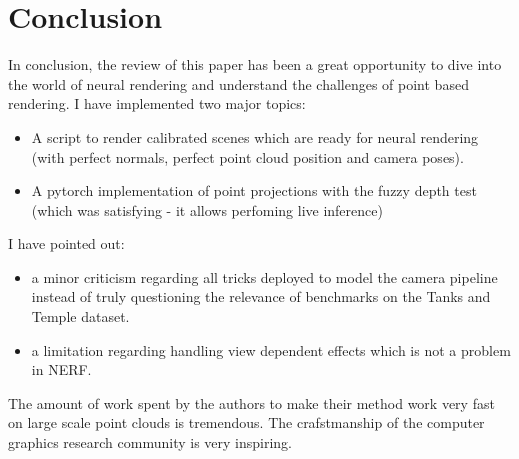 \section{Conclusion}
\label{sec:conclusion}

In conclusion, the review of this paper has been a great opportunity to dive into the world of neural rendering and understand the challenges of point based rendering.
I have implemented two major topics: 
\begin{itemize}
    \item A script to render calibrated scenes which are ready for neural rendering (with perfect normals, perfect point cloud position and camera poses). 
    \item A pytorch implementation of point projections with the fuzzy depth test (which was satisfying - it allows perfoming live inference)
\end{itemize}
I have pointed out: 
\begin{itemize}
    \item a minor criticism regarding all tricks deployed to model the camera pipeline instead of truly questioning the relevance of benchmarks on the Tanks and Temple dataset. 
    \item a limitation regarding handling view dependent effects which is not a problem in NERF.
\end{itemize}

The amount of work spent by the authors to make their method work very fast on large scale point clouds is tremendous. The crafstmanship of the computer graphics research community is very inspiring.
